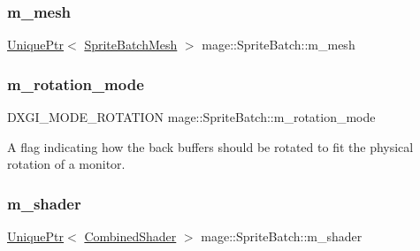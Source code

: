 \hypertarget{classmage_1_1_sprite_batch_a8e333637fa0af0858fd3a3efa1e59c3a}{}\label{classmage_1_1_sprite_batch_a8e333637fa0af0858fd3a3efa1e59c3a} 
\subsubsection{\texorpdfstring{m\+\_\+mesh}{m\_mesh}}
{\footnotesize\ttfamily \hyperlink{namespacemage_a8c307fbcc33bce9b7f2aa4c26c3b95cf}{Unique\+Ptr}$<$ \hyperlink{classmage_1_1_sprite_batch_mesh}{Sprite\+Batch\+Mesh} $>$ mage\+::\+Sprite\+Batch\+::m\+\_\+mesh\hspace{0.3cm}{\ttfamily [private]}}

\hypertarget{classmage_1_1_sprite_batch_ae062f178efe4a3af9c1573f8f8c4deee}{}\label{classmage_1_1_sprite_batch_ae062f178efe4a3af9c1573f8f8c4deee} 
\subsubsection{\texorpdfstring{m\+\_\+rotation\+\_\+mode}{m\_rotation\_mode}}
{\footnotesize\ttfamily D\+X\+G\+I\+\_\+\+M\+O\+D\+E\+\_\+\+R\+O\+T\+A\+T\+I\+ON mage\+::\+Sprite\+Batch\+::m\+\_\+rotation\+\_\+mode\hspace{0.3cm}{\ttfamily [private]}}

A flag indicating how the back buffers should be rotated to fit the physical rotation of a monitor. \hypertarget{classmage_1_1_sprite_batch_a71bd46fc89d20605fbc2e3390d02be0e}{}\label{classmage_1_1_sprite_batch_a71bd46fc89d20605fbc2e3390d02be0e} 
\subsubsection{\texorpdfstring{m\+\_\+shader}{m\_shader}}
{\footnotesize\ttfamily \hyperlink{namespacemage_a8c307fbcc33bce9b7f2aa4c26c3b95cf}{Unique\+Ptr}$<$ \hyperlink{structmage_1_1_combined_shader}{Combined\+Shader} $>$ mage\+::\+Sprite\+Batch\+::m\+\_\+shader\hspace{0.3cm}{\ttfamily [private]}}

